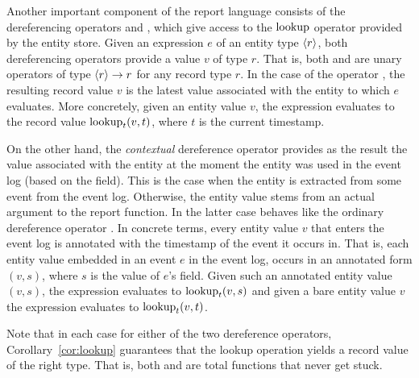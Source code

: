 Another important component of the report language consists of the
dereferencing operators \prt{!} and , which give access to the
$\operatorname{lookup}$ operator provided by the entity store. Given an
expression $e$ of an entity type $\left\langle r\right\rangle$, both dereferencing
operators provide a value $v$ of type $r$. That is, both \prt{!} and
 are unary operators of type $\left\langle r\right\rangle \to r$ for any record
type $r$. In the case of the operator \prt{!}, the resulting record
value $v$ is the latest value associated with the entity to which $e$
evaluates. More concretely, given an entity value $v$, the expression
 evaluates to the record value $\operatorname{lookup}_t(v,t)$, where $t$
is the current timestamp. 

On the other hand, the \emph{contextual} dereference operator 
provides as the result the value associated with the entity at the
moment the entity was used in the event log (based on the
 field). This is the case when the entity
is extracted from some event from the event log. Otherwise, the entity
value stems from an actual argument to the report function. In the
latter case  behaves like the ordinary dereference operator
\prt{!}. In concrete terms, every entity value $v$ that enters the
event log is annotated with the timestamp of the event it occurs
in. That is, each entity value embedded in an event $e$ in the event
log, occurs in an annotated form $(v,s)$, where $s$ is the value of
$e$'s  field. Given such an annotated entity value
$(v,s)$, the expression  evaluates to $\operatorname{lookup}_t(v,s)$
and given a bare entity value $v$ the expression  evaluates to
$\operatorname{lookup}_t(v,t)$.

Note that in each case for either of the two dereference operators,
Corollary~\ref{cor:lookup} guarantees that the lookup operation yields
a record value of the right type. That is, both 
and  are total functions that never get stuck.

